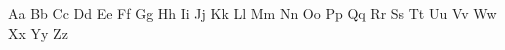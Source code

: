 \documentclass{worksheet}
\begin{document}
\begin{drillsheet}
\calligra
Aa Bb Cc Dd Ee Ff Gg Hh Ii Jj Kk Ll Mm Nn Oo Pp Qq Rr Ss Tt Uu Vv Ww Xx Yy Zz
\end{drillsheet}
\end{document}
